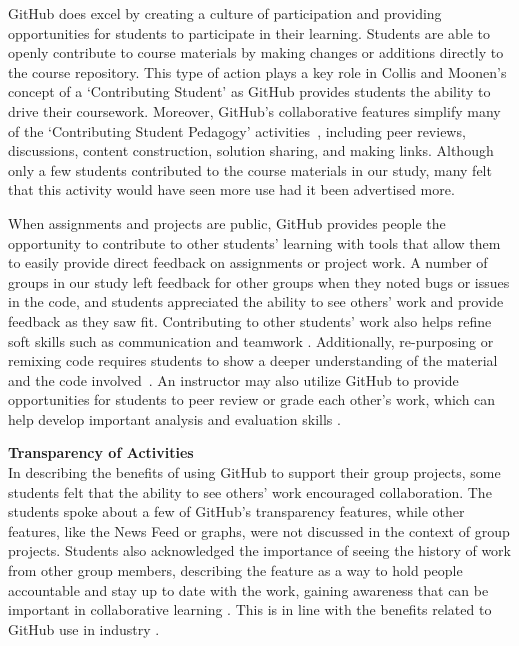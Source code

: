 GitHub does excel by creating a culture of participation \cite{jenkins2009confronting} and providing opportunities for students to participate in their learning. Students are able to openly contribute to course materials by making changes or additions directly to the course repository. This type of action plays a key role in Collis and Moonen's concept of a `Contributing Student' \cite{collis2006contributing} as GitHub provides students the ability to drive their coursework. Moreover, GitHub's collaborative features simplify many of the `Contributing Student Pedagogy' activities~\cite{hamer2011tools}, including peer reviews, discussions, content construction, solution sharing, and making links. Although only a few students contributed to the course materials in our study, many felt that this activity would have seen more use had it been advertised more.

When assignments and projects are public, GitHub provides people the opportunity to contribute to other students' learning with tools that allow them to easily provide direct feedback on assignments or project work. A number of groups in our study left feedback for other groups when they noted bugs or issues in the code, and students appreciated the ability to see others' work and provide feedback as they saw fit. Contributing to other students' work also helps refine soft skills such as communication and teamwork \cite{hamer2006some}. Additionally, re-purposing or remixing code requires students to show a deeper understanding of the material and the code involved~\cite{sant2015code}. An instructor may also utilize GitHub to provide opportunities for students to peer review or grade each other's work, which can help develop important analysis and evaluation skills \cite{sondergaard2012collaborative}.


\textbf{Transparency of Activities} \\
In describing the benefits of using GitHub to support their group projects, some students felt that the ability to see others' work encouraged collaboration. The students spoke about a few of GitHub’s transparency features, while other features, like the News Feed or graphs, were not discussed in the context of group projects. Students also acknowledged the importance of seeing the history of work from other group members, describing the feature as a way to hold people accountable and stay up to date with the work, gaining awareness that can be important in collaborative learning \cite{janssen2013coordinated}. This is in line with the benefits related to GitHub use in industry \cite{dabbish2012social}.

